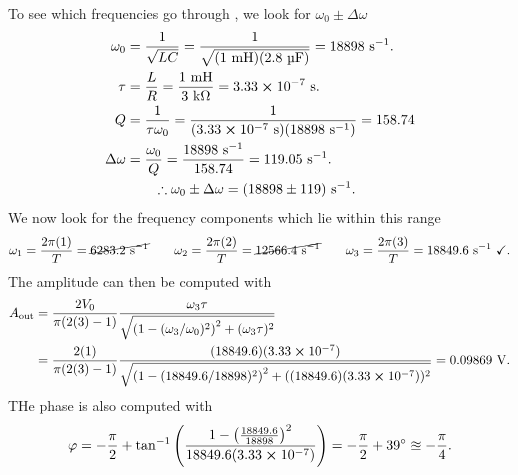 \documentclass[
	12pt,
	]{article}
\theoremstyle{definition}
\theoremstyle{definition}
\theoremstyle{definition}
\theoremstyle{definition}
\theoremstyle{definition}
\theoremstyle{example}
\theoremstyle{note}
\theoremstyle{remark}
\theoremstyle{example}
\begin{document}
					To see which frequencies go through , we look for $ \omega_{0} \pm \Delta \omega $
					\begin{align*}
						\omega_{0} &= \frac{1}{\sqrt{LC}} = \frac{1}{\sqrt{(1 \ \si{\milli\henry})(2.8 \ \si{\micro\farad})}} = 18 898 \ \si{\per\second}. \\
						\tau &= \frac{L}{R} = \frac{1 \ \si{\milli\henry}}{3 \ \si{\kilo\ohm}} = 3.33 \cross 10^{-7} \ \si{\second}.\\ 
						Q &= \frac{1}{\tau \omega_{0}} = \frac{1}{(3.33\cross 10^{-7} \ \si{\second}) (18898 \ \si{\per\second})} = 158.74\\
						\Delta \omega &= \frac{\omega_{0}}{Q} = \frac{18 898 \ \si{\per\second}}{158.74} = 119.05 \ \si{\per\second}.\\
						&\qquad \therefore \omega_{0} \pm \Delta \omega = (18 898 \pm 119) \ \si{\per\second}.
					\end{align*}
					We now look for the frequency components which lie within this range 
					$$ \omega_{1} = \frac{2\pi (1)}{T} = \cancel{6283.2 \ \si{\per\second}} \qquad \omega_{2} = \frac{2\pi (2)}{T} = \cancel{12566.4 \ \si{\per\second}} \qquad \omega_{3}=\frac{2\pi (3)}{T} = 18849.6 \ \si{\per\second} \ \checkmark.$$
					The amplitude can then be computed with 
					\begin{align*} 
					A_{\text{out}} &=  \frac{2V_{0}}{\pi(2(3) -1)}\frac{\omega_{3} \tau}{\sqrt{\left(1- (\omega_{3} / \omega_{0})^{2}\right)^{2} + (\omega_{3} \tau)^{2}}} \\
					&=  \frac{2(1)}{\pi(2(3) -1)}\frac{(18849.6)(3.33\cross10^{-7})}{\sqrt{\left(1- (18849.6 / 18898)^{2}\right)^{2} + ((18849.6)(3.33\cross10^{-7}))^{2}}} = 0.09869 \ \si{\volt}.
					\end{align*}
					THe phase is also computed with 
					\begin{align*}
						\varphi = -\frac{\pi}{2} + \tan^{-1}\left(\frac{1-\left(\frac{18849.6}{18898}\right)^{2}}{18849.6(3.33\cross 10^{-7})}\right) = -\frac{\pi}{2} + 39^{\circ} \approxeq -\frac{\pi}{4}.
					\end{align*}
\end{document}
